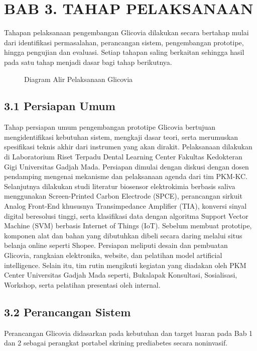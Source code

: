 \documentclass[12pt,a4paper]{article}
\begin{document}
\section*{BAB 3. TAHAP PELAKSANAAN}

Tahapan pelaksanaan pengembangan Glicovia dilakukan secara bertahap mulai dari identifikasi permasalahan, perancangan sistem, pengembangan prototipe, hingga pengujian dan evaluasi. Setiap tahapan saling berkaitan sehingga hasil pada satu tahap menjadi dasar bagi tahap berikutnya.

\begin{figure}[htbp]
    \centering
    \caption{Diagram Alir Pelaksanaan Glicovia}
    \label{fig:diagram_alir}
\end{figure}

\subsection*{3.1 Persiapan Umum}
Tahap persiapan umum pengembangan prototipe Glicovia bertujuan mengidentifikasi kebutuhan sistem, mengkaji dasar teori, serta merumuskan spesifikasi teknis akhir dari instrumen yang akan dirakit. Pelaksanaan dilakukan di Laboratorium Riset Terpadu Dental Learning Center Fakultas Kedokteran Gigi Universitas Gadjah Mada. Persiapan dimulai dengan diskusi dengan dosen pendamping mengenai mekanisme dan pelaksanaan agenda dari tim PKM-KC. Selanjutnya dilakukan studi literatur biosensor elektrokimia berbasis saliva menggunakan Screen-Printed Carbon Electrode (SPCE), perancangan sirkuit Analog Front-End khususnya Transimpedance Amplifier (TIA), konversi sinyal digital beresolusi tinggi, serta klasifikasi data dengan algoritma Support Vector Machine (SVM) berbasis Internet of Things (IoT). Sebelum membuat prototipe, komponen alat dan bahan yang dibutuhkan dibeli secara daring melalui situs belanja online seperti Shopee. Persiapan meliputi desain dan pembuatan Glicovia, rangkaian elektronika, website, dan pelatihan model artificial intelligence. Selain itu, tim rutin mengikuti kegiatan yang diadakan oleh PKM Center Universitas Gadjah Mada seperti, Bukalapak Konsultasi, Sosialisasi, Workshop, serta pelatihan presentasi oleh internal.

\subsection*{3.2 Perancangan Sistem}
Perancangan Glicovia didasarkan pada kebutuhan dan target luaran pada Bab 1 dan 2 sebagai perangkat portabel skrining prediabetes secara noninvasif.
\end{document}
